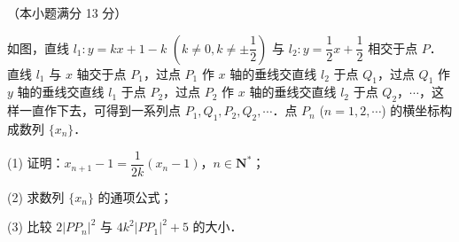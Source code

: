 \begin{question}
（本小题满分 13 分）

如图，直线 $l_1: y = kx + 1 - k$ $\left(k \neq 0, k \neq \pm \dfrac{1}{2}\right)$ 与 $l_2: y = \dfrac{1}{2}x + \dfrac{1}{2}$ 相交于点 $P$．直线 $l_1$ 与 $x$ 轴交于点 $P_1$，过点 $P_1$ 作 $x$ 轴的垂线交直线 $l_2$ 于点 $Q_1$，过点 $Q_1$ 作 $y$ 轴的垂线交直线 $l_1$ 于点 $P_2$，过点 $P_2$ 作 $x$ 轴的垂线交直线 $l_2$ 于点 $Q_2$，$\cdots$，这样一直作下去，可得到一系列点 $P_1, Q_1, P_2, Q_2, \cdots$．点 $P_n$ ($n = 1, 2, \cdots$) 的横坐标构成数列 $\{x_n\}$．
\nopagebreak[4]
\begin{center}\end{center}
\nopagebreak[4]
(1) 证明：$x_{n+1} - 1 = \dfrac{1}{2k}(x_n - 1)$，$n \in \mathbf{N}^*$；

(2) 求数列 $\{x_n\}$ 的通项公式；

(3) 比较 $2|PP_n|^2$ 与 $4k^2|PP_1|^2 + 5$ 的大小．

\end{question}